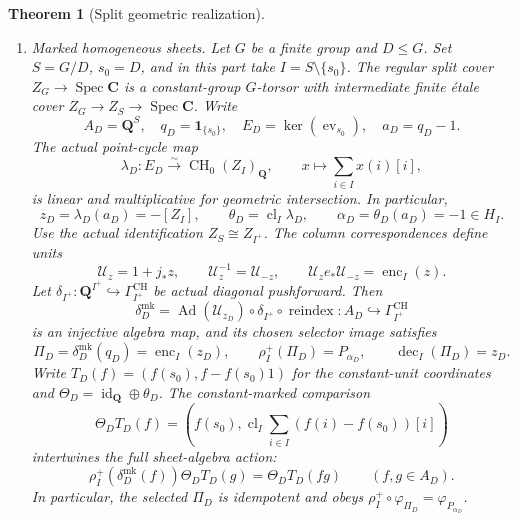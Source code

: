 \documentclass[11pt]{article}
\newtheorem{theorem}{Theorem}[section]
\theoremstyle{definition}
\theoremstyle{remark}
\DeclareMathOperator{\Spec}{Spec}
\DeclareMathOperator{\ev}{ev}
\DeclareMathOperator{\CH}{CH}
\newcommand{\Q}{\mathbf Q}
\newcommand{\one}{\mathbf 1}
\begin{document}
\begin{theorem}[Split geometric realization]
\begin{enumerate}[label=\textup{(\roman*)},leftmargin=*]
\item \emph{Marked homogeneous sheets.}
Let \(G\) be a finite group and \(D\leq G\).  Set
\(S=G/D\), \(s_0=D\), and in this part take
\(I=S\setminus\{s_0\}\).
The regular split cover \(Z_G\to\Spec\mathbf C\) is a
constant-group \(G\)-torsor with intermediate finite \'etale cover
\(Z_G\to Z_S\to\Spec\mathbf C\).
Write
\[
 A_D=\Q^S,\quad q_D=\one_{\{s_0\}},\quad
 E_D=\ker(\ev_{s_0}),\quad a_D=q_D-1.
\]
The actual point-cycle map
\[
 \lambda_D:E_D\xrightarrow{\sim}\CH_0(Z_I)_{\Q},
 \qquad x\longmapsto\sum_{i\in I}x(i)[i],
\]
is linear and multiplicative for geometric intersection.  In particular,
\[
 z_D=\lambda_D(a_D)=-[Z_I],\qquad
 \theta_D=\operatorname{cl}_I\lambda_D,\qquad
 \alpha_D=\theta_D(a_D)=-1\in H_I.
\]
Use the actual identification \(Z_S\cong Z_{I^+}\).  The column
correspondences define units
\[
 \mathcal U_z=1+j_*z,\qquad
 \mathcal U_z^{-1}=\mathcal U_{-z},\qquad
 \mathcal U_z e_*\mathcal U_{-z}=\operatorname{enc}_I(z).
\]
Let \(\delta_{I^+}:\Q^{I^+}\hookrightarrow\Gamma_{I^+}^{\mathrm{CH}}\)
be actual diagonal pushforward.  Then
\[
 \delta_D^{\mathrm{mk}}
   =\operatorname{Ad}(\mathcal U_{z_D})\circ\delta_{I^+}
       \circ\operatorname{reindex}
       :A_D\hookrightarrow\Gamma_{I^+}^{\mathrm{CH}}
\]
is an injective algebra map, and its chosen selector image satisfies
\[
 \Pi_D=\delta_D^{\mathrm{mk}}(q_D)=\operatorname{enc}_I(z_D),
 \qquad \rho_I^+(\Pi_D)=P_{\alpha_D},
 \qquad \operatorname{dec}_I(\Pi_D)=z_D.
\]
Write \(T_D(f)=(f(s_0),f-f(s_0)1)\) for the constant-unit
coordinates and \(\Theta_D=\operatorname{id}_{\Q}\oplus\theta_D\).
The constant-marked comparison
\[
 \Theta_DT_D(f)=\left(f(s_0),\operatorname{cl}_I
                  \sum_{i\in I}(f(i)-f(s_0))[i]\right)
\]
intertwines the full sheet-algebra action:
\[
 \rho_I^+(\delta_D^{\mathrm{mk}}(f))\Theta_DT_D(g)=\Theta_DT_D(fg)
       \qquad(f,g\in A_D).
\]
In particular, the selected \(\Pi_D\) is idempotent and obeys
\(\rho_I^+\circ\varphi_{\Pi_D}=\varphi_{P_{\alpha_D}}\).
\end{enumerate}
\end{theorem}
\end{document}
